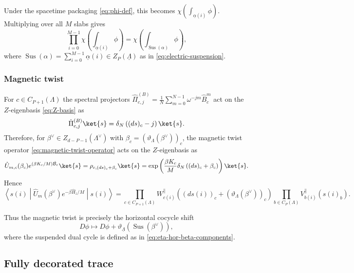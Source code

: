 \documentclass[dvipsnames,a4paper]{article}
\numberwithin{equation}{section}
\theoremstyle{definition}
\theoremstyle{remark}
\newcommand{\matrixel}[3]{\left\langle #1 \middle| #2 \middle| #3 \right\rangle}
\newcommand{\Sus}{\operatorname{Sus}}
\begin{document}
Under the spacetime packaging \eqref{eq:phi-def}, this becomes $\chi\left(\int_{\underline\alpha(i)}\phi\right)$.
Multiplying over all \(M\) slabs gives
\begin{equation}
	\prod_{i=0}^{M-1}
	\chi\left(\int_{\underline\alpha(i)}\phi\right)
	=
	\chi\left(\int_{\Sus(\alpha)}\phi\right),
	\label{eq:Sus-alpha-factor}
\end{equation}
where $\Sus(\alpha)=\sum_{i=0}^{M-1}\underline\alpha(i)\in Z_P(\underline\Lambda)$ as in \eqref{eq:electric-suspension}.

\subsubsection{Magnetic twist}
\label{app:magnetic-twist}

For $c\in C_{P+1}(\Lambda)$ the spectral projectors $\hat\Pi_{c,j}^{(B)} = \frac{1}{N} \sum_{m=0}^{N-1} \omega^{-jm} \hat B_c^m$ act on the $Z$-eigenbasis \eqref{eq:Z-basis} as
\begin{equation}
	\hat\Pi_{c,j}^{(B)}\ket{s}
	=
	\delta_N\left((ds)_c-j\right)\ket{s}.
\end{equation}
Therefore, for $\beta^\vee\in Z_{d-P-1}(\Lambda^\vee)$ with $\beta_c = (\vartheta_\Lambda(\beta^\vee))_c$, the  magnetic twist operator \eqref{eq:magnetic-twist-operator} acts on the $Z$-eigenbasis as
\begin{equation}
	\hat U_{m,c}(\beta_c)e^{(\beta K_c/M)\hat{\mathcal B}_c}\ket{s}
	=
	\rho_{c,(ds)_c+\beta_c}\ket{s}
	=
	\exp\left(
	\frac{\beta K_c}{M}\delta_N\left((ds)_c+\beta_c\right)
	\right)\ket{s}.
	\label{eq:Um-shift}
\end{equation}
Hence
\begin{equation}
	\matrixel{s(i)}{\hat U_m(\beta^\vee)e^{-\beta\hat H_z/M}}{s(i)}
	=
	\prod_{c\in C_{P+1}(\Lambda)}
	W_{c(i)}^{\parallel}
	\left((ds(i))_c+(\vartheta_\Lambda(\beta^\vee))_c\right)
	\prod_{b\in C_P(\Lambda)}
	V_{b(i)}^{\parallel}\left(s(i)_b\right).
	\label{eq:magnetic-twist-zkernel}
\end{equation}

Thus the magnetic twist is precisely the horizontal cocycle shift
\begin{equation}
	D\phi
	\mapsto
	D\phi+\vartheta_{\underline\Lambda}(\Sus(\beta^\vee)),
\end{equation}
where the suspended dual cycle is defined as in \eqref{eq:eta-hor-beta-components}.

\subsection{Fully decorated trace}
\label{app:TrFull}
\end{document}
